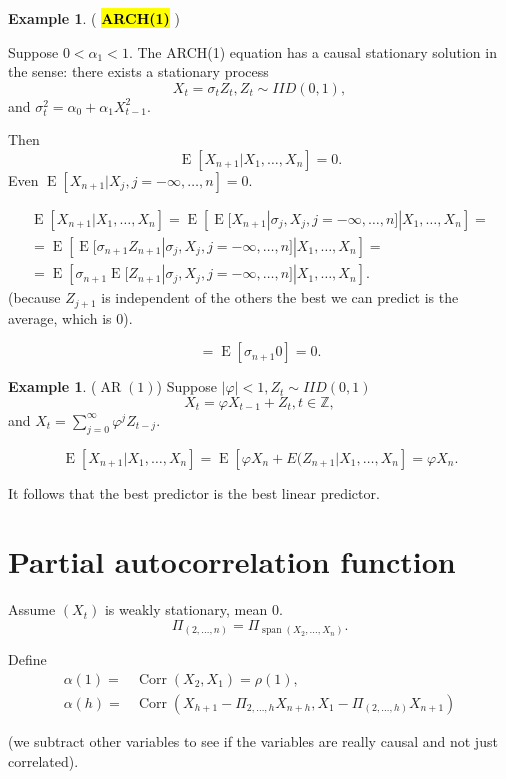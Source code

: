 \documentclass[12pt,a4paper, notitlepage]{book}
\newcommand{\hlc}[2][yellow]{ {\sethlcolor{#1} \hl{#2}} }
\newcommand{\hlcr}[1]{\hlc[lightred]{#1}}
\theoremstyle{definition} %
\newtheorem{example}[definition]{Example}
\theoremstyle{plain} %
\newcommand{\Z}{\mathbb Z}
\DeclareMathOperator{\E}{E}
\DeclareMathOperator{\Span}{span}
\DeclareMathOperator{\Corr}{Corr}
\DeclareMathOperator{\Ar}{AR}
\newcommand{\New}[1]{ {\bf \hlcr{#1} } }
\begin{document}
\begin{example} (\New{ARCH(1)})

Suppose $0< \alpha_1 < 1$. The ARCH(1) equation has a causal stationary solution in the sense:
there exists a stationary process 
\[ X_t = \sigma_t Z_t, Z_t \sim IID(0,1) , \]
 and $\sigma_t^2 = \alpha_0 + \alpha_1 X_{t-1}^2$. 

Then 
\[ \E[X_{n+1} | X_1, \dots, X_n] = 0. \] 
 Even $ \E[X_{n+1} | X_j, j =-\infty, \dots, n] = 0$.

\begin{align*}
\E[X_{n+1} | X_1, \dots, X_n ] = \E \left[ \E[X_{n+1}|\sigma_j, X_j, j = -\infty, \dots, n] |X_1, \dots, X_n \right] = \\
=  \E\left[\E[\sigma_{n+1} Z_{n+1}|\sigma_j, X_j, j = -\infty, \dots, n] |X_1, \dots, X_n \right] = \\
=  \E\left[ \sigma_{n+1} \E[Z_{n+1}|\sigma_j, X_j, j = -\infty, \dots, n]|X_1, \dots, X_n \right] . 
\end{align*}
 (because $Z_{j+1}$ is independent of the others the best we can predict is the average, which is $0$).

\[ = \E[\sigma_{n+1} 0] = 0. \]
\end{example}

\begin{example} ($\Ar(1)$)
Suppose $|\varphi| < 1, Z_t \sim IID(0,1)$ 
\[  X_t = \varphi X_{t-1} + Z_t, t\in \Z , \]
 and $X_t = \sum_{j = 0}^\infty \varphi^j Z_{t-j}$.

\[ \E[X_{n+1}|X_1, \ldots , X_n] = \E[ \varphi X_n + E(Z_{n+1} | X_1, \ldots, X_n] = \varphi X_n. \]

It follows that the best predictor is the best linear predictor.
\end{example}

\section{ Partial autocorrelation function}

Assume $(X_t)$ is weakly stationary, mean $0$.
\[ \Pi_{(2, \dots, n)} = \Pi_{\Span(X_2, \dots, X_n)} . \]

Define 
\begin{align*} \alpha(1) = & \Corr(X_2, X_1) = \rho(1), \\
 \alpha(h) = & \Corr(X_{h+1} - \Pi_{2, \dots, h} X_{n+h}, X_1 - \Pi_{(2, \dots, h)}X_{n+1}) \end{align*}

(we subtract other variables to see if the variables are really causal and not just correlated).
\end{document}
